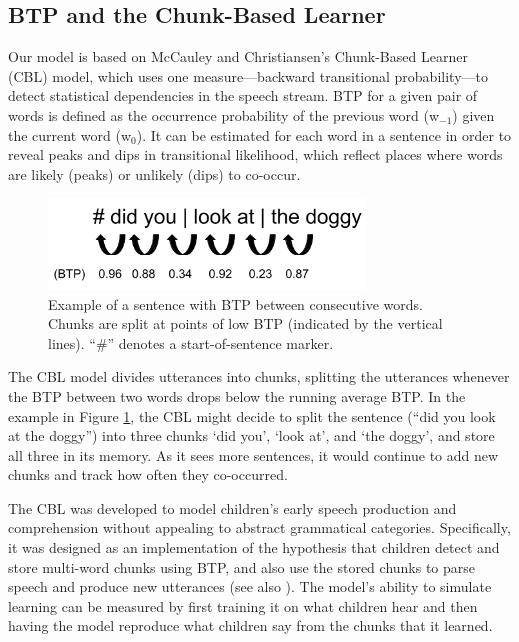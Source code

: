 \documentclass{article}
\begin{document}
\subsection{BTP and the Chunk-Based Learner}

Our model is based on McCauley and Christiansen's \citeyear{mccauley2011learning,mccauley2014acquiring} Chunk-Based Learner (CBL) model, which uses one measure---backward transitional probability---to detect statistical dependencies in the speech stream. BTP for a given pair of words is defined as the occurrence probability of the previous word (w$_{-1}$) given the current word (w$_0$). It can be estimated for each word in a sentence in order to reveal peaks and dips in transitional likelihood, which reflect places where words are likely (peaks) or unlikely (dips) to co-occur.

\begin{figure}
\centering
\includegraphics[width=0.75\textwidth]{images/chunking_mechanism.png} 
\caption{Example of a sentence with BTP between consecutive words. Chunks are split at points of low BTP (indicated by the vertical lines). ``\#'' denotes a start-of-sentence marker.}
\label{fig:chunking}
\end{figure}

The CBL model divides utterances into chunks, splitting the utterances whenever the BTP between two words drops below the running average BTP. In the example in Figure \ref{fig:chunking}, the CBL might decide to split the sentence (``did you look at the doggy'') into three chunks `did you', `look at', and `the doggy', and store all three in its memory. As it sees more sentences, it would continue to add new chunks and track how often they co-occurred.

The CBL was developed to model children's early speech production and comprehension without appealing to abstract grammatical categories. Specifically, it was designed as an implementation of the hypothesis that children detect and store multi-word chunks using BTP, and also use the stored chunks to parse speech and produce new utterances (see also ). The model's ability to simulate learning can be measured by first training it on what children hear and then having the model reproduce what children say from the chunks that it learned.
\end{document}
